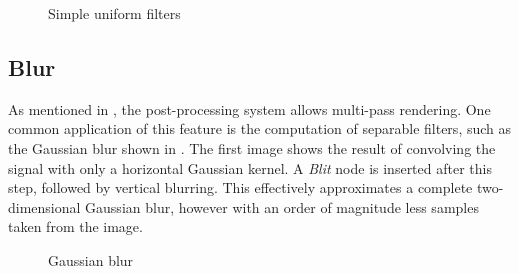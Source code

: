 \begin{figure}[ht!]
  \centering
  \caption{Simple uniform filters}
  \label{fig:postProcSimple}
\end{figure}

\subsection{Blur}

As mentioned in , the post-processing system allows multi-pass rendering. One common application of this feature is the computation of separable filters, such as the Gaussian blur shown in . The first image shows the result of convolving the signal with only a horizontal Gaussian kernel. A \emph{Blit} node is inserted after this step, followed by vertical blurring. This effectively approximates a complete two-dimensional Gaussian blur, however with an order of magnitude less samples taken from the image.

\begin{figure}[ht!]
  \centering
  \caption{Gaussian blur}
  \label{fig:postProcBlur}
\end{figure}

